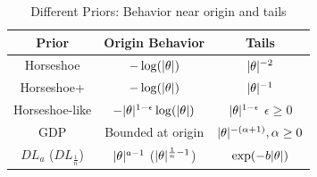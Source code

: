 \documentclass[11pt]{article}
\begin{document}
\begin{table}%
\centering
\begin{tabular}{| c | c |c |}
\hline
Prior & Origin Behavior & Tails \\
\hline 
Horseshoe & $-\log(\lvert\theta\rvert)$ & $\lvert\theta\rvert^{-2}$ \\
Horseshoe+ & $-\log(\lvert\theta\rvert)$ & $\lvert\theta\rvert^{-1}$ \\
Horseshoe-like & $-\lvert\theta\rvert^{1-\epsilon}\log(\lvert\theta\rvert)$ & $\lvert\theta\rvert^{1-\epsilon}$ $\epsilon \ge 0$\\
GDP & Bounded at origin & $\lvert\theta\rvert^{-(\alpha + 1)}, \alpha \ge 0$ \\
$DL_{a}$ ($DL_{\frac{1}{n}}$) & $\lvert\theta\rvert^{a-1}$ ($\lvert\theta\rvert^{\frac{1}{n}-1}$) & $\exp(-b\lvert\theta\rvert)$ \\
\hline
\end{tabular}
\caption{Different Priors: Behavior near origin and tails}
\label{tab:priors}
\end{table}
\end{document}
